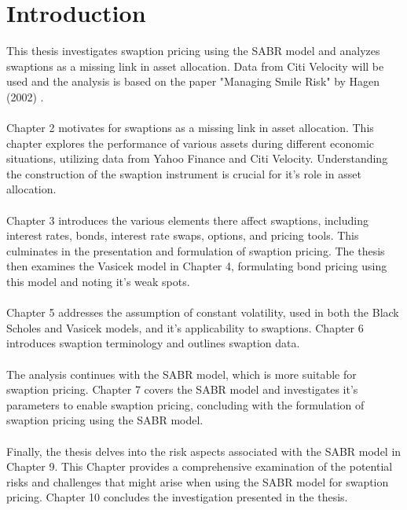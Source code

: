 \section{Introduction}

This thesis investigates swaption pricing using the SABR model
and analyzes swaptions as a missing link in asset allocation. 
Data from Citi Velocity will be used and the analysis is 
based on the paper "Managing Smile Risk" by Hagen (2002) 
\cite{Smile}.
\\\\
Chapter 2 motivates for swaptions as a missing link 
in asset allocation. This chapter explores the performance 
of various assets during different economic situations, 
utilizing data from Yahoo Finance and Citi Velocity. 
Understanding the construction of the swaption instrument 
is crucial for it's role in asset allocation.
\\\\
Chapter 3 introduces the various elements there affect 
swaptions, including interest rates, bonds, interest 
rate swaps, options, and pricing tools. This culminates 
in the presentation and formulation of swaption pricing. 
The thesis then examines the Vasicek model in Chapter 4, 
formulating bond pricing using this model and noting it's 
weak spots.
\\\\
Chapter 5 addresses the assumption of constant volatility, 
used in both the Black Scholes and Vasicek models, 
and it's applicability to swaptions. Chapter 6 introduces 
swaption terminology and outlines swaption data.
\\\\
The analysis continues with the SABR model, which is 
more suitable for swaption pricing. Chapter 7 covers the SABR model 
and investigates it's parameters to enable swaption pricing, 
concluding with the formulation of swaption pricing using 
the SABR model.
\\\\
Finally, the thesis delves into the risk aspects associated 
with the SABR model in Chapter 9. This Chapter provides a 
comprehensive examination of the potential risks and 
challenges that might arise when using the SABR model 
for swaption pricing.
Chapter 10 concludes the investigation presented in the thesis. 
